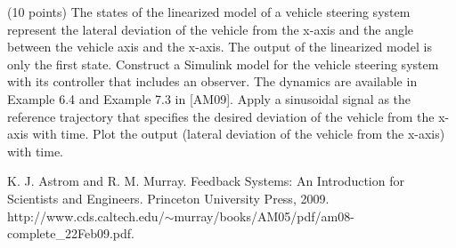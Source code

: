 \documentclass[a4paper, 12pt]{article}
\begin{document}
\newpage

\begin{problem}{}
(10 points) The states of the linearized model of a vehicle steering system represent the lateral deviation of the vehicle from the x-axis and the angle between the vehicle axis and the x-axis. The output of the linearized model is only the first state. Construct a Simulink model for the vehicle steering system with its controller that includes an observer. The dynamics are available in Example 6.4 and Example 7.3 in [AM09]. Apply a sinusoidal signal as the reference trajectory that specifies the desired deviation of the vehicle from the x-axis with time. Plot the output (lateral deviation of the vehicle from the x-axis) with time. 

\noindent
\noindent
[AM09] K. J. Astrom and R. M. Murray. Feedback Systems: An Introduction for Scientists and Engineers. Princeton University Press, 2009. \\
http://www.cds.caltech.edu/$\sim$murray/books/AM05/pdf/am08-complete\_22Feb09.pdf. \\
\\
\begin{minipage}{1\textwidth}
		\rectangle{\linewidth}{20cm}
\end{minipage}
\newpage
\ \\
\begin{minipage}{1\textwidth}
		\rectangle{\linewidth}{24cm}
\end{minipage}
\newpage
\ \\
\begin{minipage}{1\textwidth}
		\rectangle{\linewidth}{24cm}
\end{minipage}
\newpage
\ \\
\begin{minipage}{1\textwidth}
		\rectangle{\linewidth}{24cm}
\end{minipage}
\end{problem}

\newpage
\end{document}
